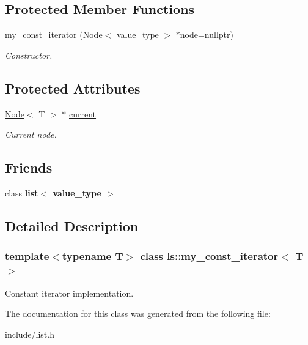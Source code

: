 \subsection*{Protected Member Functions}
\begin{DoxyCompactItemize}
\item 
\mbox{\label{classls_1_1my__const__iterator_a8ab448e804fac2d5117de8c8261a5873}} 
\hyperlink{classls_1_1my__const__iterator_a8ab448e804fac2d5117de8c8261a5873}{my\+\_\+const\+\_\+iterator} (\hyperlink{structls_1_1Node}{Node}$<$ \hyperlink{classls_1_1my__const__iterator_aa7aa8489a065e4ddda33727d33c84b7d}{value\+\_\+type} $>$ $\ast$node=nullptr)
\begin{DoxyCompactList}\small\item\em Constructor. \end{DoxyCompactList}\end{DoxyCompactItemize}
\subsection*{Protected Attributes}
\begin{DoxyCompactItemize}
\item 
\mbox{\label{classls_1_1my__const__iterator_a18548367e7f30dc4e358eff9172ba995}} 
\hyperlink{structls_1_1Node}{Node}$<$ T $>$ $\ast$ \hyperlink{classls_1_1my__const__iterator_a18548367e7f30dc4e358eff9172ba995}{current}
\begin{DoxyCompactList}\small\item\em Current node. \end{DoxyCompactList}\end{DoxyCompactItemize}
\subsection*{Friends}
\begin{DoxyCompactItemize}
\item 
\mbox{\label{classls_1_1my__const__iterator_aa4cf6f043abfca0b41eb074c92dac6fa}} 
class {\bfseries list$<$ value\+\_\+type $>$}
\end{DoxyCompactItemize}


\subsection{Detailed Description}
\subsubsection*{template$<$typename T$>$\newline
class ls\+::my\+\_\+const\+\_\+iterator$<$ T $>$}

Constant iterator implementation. 

The documentation for this class was generated from the following file\+:\begin{DoxyCompactItemize}
\item 
include/list.\+h\end{DoxyCompactItemize}
